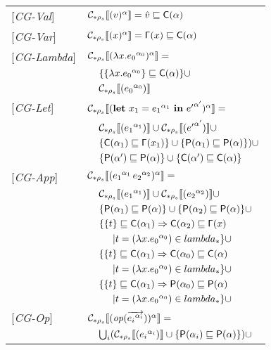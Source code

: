 \begin{table}[htb]
\begin{tabular}{l l l l}
{[\textit{CG-Val}]} & \multicolumn{3}{l}{$ \mathcal{C}_{*\rho_s}\llbracket (v)^\alpha \rrbracket = \hat{v} \sqsubseteq \mathsf{C}(\alpha)$} \\ 
{[\textit{CG-Var}]} & \multicolumn{3}{l}{$ \mathcal{C}_{*\rho_s}\llbracket (x)^\alpha \rrbracket = \mathsf{\Gamma}(x) \sqsubseteq \mathsf{C}(\alpha)$} \\ 
{[\textit{CG-Lambda}]} & \multicolumn{3}{l}{$ \mathcal{C}_{*\rho_s}\llbracket (\lambda x.{e_0}^{\alpha_0})^\alpha \rrbracket = $}\\
&& \multicolumn{2}{l}{$\{\{\lambda x.{e_0}^{\alpha_0}\} \sqsubseteq \mathsf{C}(\alpha)\}\cup $}\\
&& \multicolumn{2}{l}{$ \mathcal{C}_{*\rho_s}\llbracket ({e_0}^{\alpha_0}) \rrbracket $} \\
{[\textit{CG-Let}]} & \multicolumn{3}{l}{$\mathcal{C}_{*\rho_s}\llbracket (\mathbf{let}\ x_1 = {e_1}^{\alpha_1}\ \mathbf{in}\ {e'}^{\alpha'})^\alpha \rrbracket = $}\\
&& \multicolumn{2}{l}{$ \mathcal{C}_{*\rho_s}\llbracket ({e_1}^{\alpha_1}) \rrbracket \cup \mathcal{C}_{*\rho_s}\llbracket ({e'}^{\alpha'}) \rrbracket \cup$ }\\
&& \multicolumn{2}{l}{$ \{\mathsf{C}(\alpha_1) \sqsubseteq \mathsf{\Gamma}(x_1)\} \cup \{ \mathsf{P}(\alpha_1) \sqsubseteq \mathsf{P}(\alpha) \}) \cup $} \\
&& \multicolumn{2}{l}{$ \{\mathsf{P}(\alpha') \sqsubseteq \mathsf{P}(\alpha)\} \cup \{\mathsf{C}(\alpha') \sqsubseteq \mathsf{C}(\alpha)\} $}\\
{[\textit{CG-App}]}&\multicolumn{3}{l}{$ \mathcal{C}_{*\rho_s}\llbracket ({e_1}^{\alpha_1}\, {e_2}^{\alpha_2})^\alpha \rrbracket = $}\\
&& \multicolumn{2}{l}{$\mathcal{C}_{*\rho_s}\llbracket ({e_1}^{\alpha_1}) \rrbracket \cup \mathcal{C}_{*\rho_s}\llbracket ({e_2}^{\alpha_2}) \rrbracket \cup$} \\
&& \multicolumn{2}{l}{$\{ \mathsf{P}(\alpha_1) \sqsubseteq \mathsf{P}(\alpha) \} \cup \{ \mathsf{P}(\alpha_2) \sqsubseteq \mathsf{P}(\alpha) \}\cup$} \\
&& \multicolumn{2}{l}{$\{\{ t \} \sqsubseteq \mathsf{C}(\alpha_1) \Rightarrow \mathsf{C}(\alpha_2) \sqsubseteq \mathsf{\Gamma}(x)$}\\
&&&$| t = (\lambda x.{e_0}^{\alpha_0}) \in lambda_* \}\cup$\\
&& \multicolumn{2}{l}{$\{\{ t \} \sqsubseteq \mathsf{C}(\alpha_1) \Rightarrow \mathsf{C}(\alpha_0) \sqsubseteq \mathsf{C}(\alpha)$}\\
&&&$| t = (\lambda x.{e_0}^{\alpha_0}) \in lambda_* \}\cup$\\
&& \multicolumn{2}{l}{$\{\{ t \} \sqsubseteq \mathsf{C}(\alpha_1) \Rightarrow \mathsf{P}(\alpha_0) \sqsubseteq \mathsf{P}(\alpha)$}\\
&&&$| t = (\lambda x.{e_0}^{\alpha_0}) \in lambda_* \}\cup$\\
{[\textit{CG-Op}]}&\multicolumn{3}{l}{$ \mathcal{C}_{*\rho_s}\llbracket (\mathit{op} (\overrightarrow{{e_i}^{\alpha_i}}))^\alpha \rrbracket = $}\\
&&\multicolumn{2}{l}{$\bigcup_i (\mathcal{C}_{*\rho_s}\llbracket ({e_i}^{\alpha_i}) \rrbracket \cup \{ \mathsf{P}(\alpha_i) \sqsubseteq \mathsf{P}(\alpha) \})\cup$}\\

\end{tabular}
\end{table}
